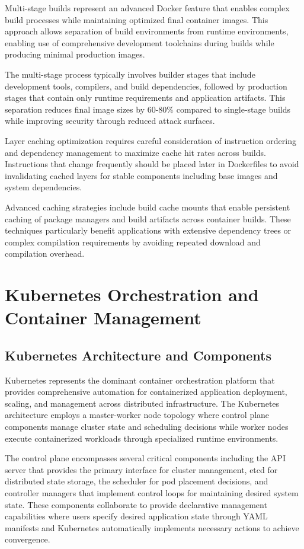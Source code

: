 Multi-stage builds represent an advanced Docker feature that enables complex build processes while maintaining optimized final container images. This approach allows separation of build environments from runtime environments, enabling use of comprehensive development toolchains during builds while producing minimal production images.

The multi-stage process typically involves builder stages that include development tools, compilers, and build dependencies, followed by production stages that contain only runtime requirements and application artifacts. This separation reduces final image sizes by 60-80\% compared to single-stage builds while improving security through reduced attack surfaces.

Layer caching optimization requires careful consideration of instruction ordering and dependency management to maximize cache hit rates across builds. Instructions that change frequently should be placed later in Dockerfiles to avoid invalidating cached layers for stable components including base images and system dependencies.

Advanced caching strategies include build cache mounts that enable persistent caching of package managers and build artifacts across container builds. These techniques particularly benefit applications with extensive dependency trees or complex compilation requirements by avoiding repeated download and compilation overhead.

\section{Kubernetes Orchestration and Container Management}

\subsection{Kubernetes Architecture and Components}

Kubernetes represents the dominant container orchestration platform that provides comprehensive automation for containerized application deployment, scaling, and management across distributed infrastructure. The Kubernetes architecture employs a master-worker node topology where control plane components manage cluster state and scheduling decisions while worker nodes execute containerized workloads through specialized runtime environments.

The control plane encompasses several critical components including the API server that provides the primary interface for cluster management, etcd for distributed state storage, the scheduler for pod placement decisions, and controller managers that implement control loops for maintaining desired system state. These components collaborate to provide declarative management capabilities where users specify desired application state through YAML manifests and Kubernetes automatically implements necessary actions to achieve convergence.

